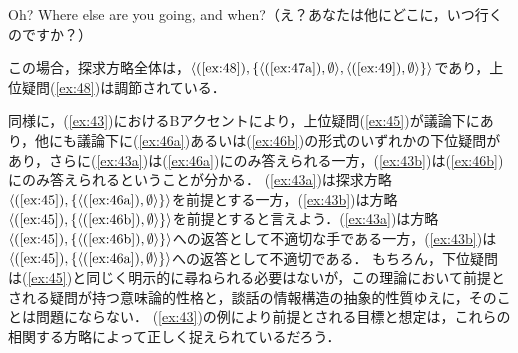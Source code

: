 \documentclass{goken}
\newcommand{\ori}[1]{\noindent\textcolor[gray]{0.7}{\fontsize{8pt}{8pt}\selectfont{\textsf{(p.~#1)}}} }
\begin{document}
\begin{exe}
	\ex\label{ex:49}
  Oh? Where else are you going, and when?（え？あなたは他にどこに，いつ行くのですか？）
\end{exe}

\noindent
この場合，探求方略全体は，$\langle(\ref{ex:48}), \{\langle(\text{\ref{ex:47a}}), \emptyset\rangle,\langle(\ref{ex:49}), \emptyset\rangle\}\rangle$であり，上位疑問(\ref{ex:48})は調節されている．

\ori{49}
同様に，(\ref{ex:43})におけるBアクセントにより，上位疑問(\ref{ex:45})が議論下にあり，他にも議論下に(\ref{ex:46a})あるいは(\ref{ex:46b})の形式のいずれかの下位疑問があり，さらに(\ref{ex:43a})は(\ref{ex:46a})にのみ答えられる一方，(\ref{ex:43b})は(\ref{ex:46b})にのみ答えられるということが分かる．
(\ref{ex:43a})は探求方略$\langle(\ref{ex:45}), \{\langle(\text{\ref{ex:46a}}), \emptyset\rangle\}\rangle$を前提とする一方，(\ref{ex:43b})は方略$\langle(\ref{ex:45}), \{\langle(\text{\ref{ex:46b}}), \emptyset\rangle\}\rangle$を前提とすると言えよう．(\ref{ex:43a})は方略$\langle(\ref{ex:45}), \{\langle(\text{\ref{ex:46b}}),\emptyset\rangle\}\rangle$への返答として不適切な手である一方，(\ref{ex:43b})は$\langle(\ref{ex:45}), \{\langle(\text{\ref{ex:46a}}),\emptyset\rangle\}\rangle$への返答として不適切である．
もちろん，下位疑問は(\ref{ex:45})と同じく明示的に尋ねられる必要はないが，この理論において前提とされる疑問が持つ意味論的性格と，談話の情報構造の抽象的性質ゆえに，そのことは問題にならない．
(\ref{ex:43})の例により前提とされる目標と想定は，これらの相関する方略によって正しく捉えられているだろう．
\end{document}
